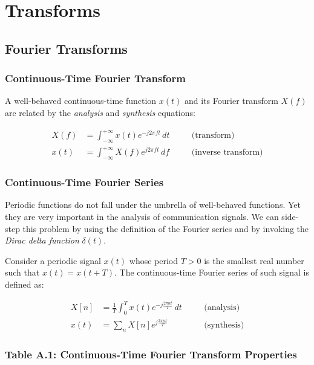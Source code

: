 \section{Transforms}

\subsection{Fourier Transforms}

\subsubsection{Continuous-Time Fourier Transform}

A well-behaved continuous-time function $x(t)$ and its Fourier transform $X(f)$ are related by the \textit{analysis} and \textit{synthesis} equations:

\begin{align}
X(f) &= \int_{-\infty}^{+\infty} x(t)e^{-j 2\pi f t}\,dt 
\quad &&\text{(transform)} \tag{A.1} \\[8pt]
x(t) &= \int_{-\infty}^{+\infty} X(f)e^{j 2\pi f t}\,df 
\quad &&\text{(inverse transform)} \tag{A.2}
\end{align}

\subsubsection{Continuous-Time Fourier Series}

Periodic functions do not fall under the umbrella of well-behaved functions. Yet they are very important in the analysis of communication signals. We can side-step this problem by using the definition of the Fourier series and by invoking the \textit{Dirac delta function} $\delta(t)$.

Consider a periodic signal $x(t)$ whose period $T > 0$ is the smallest real number such that $x(t) = x(t + T)$. The continuous-time Fourier series of such signal is defined as:

\begin{align}
X[n] &= \frac{1}{T} \int_{0}^{T} x(t)e^{-j\frac{2\pi n t}{T}}\,dt 
\quad &&\text{(analysis)} \tag{A.3} \\[8pt]
x(t) &= \sum_{n} X[n]e^{j\frac{2\pi n t}{T}} 
\quad &&\text{(synthesis)} \tag{A.4}
\end{align}

\subsubsection{Table A.1: Continuous-Time Fourier Transform Properties}

